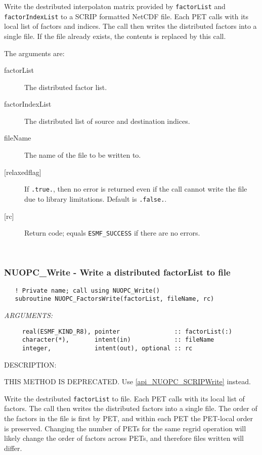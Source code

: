      \label{api_NUOPC_SCRIPWrite}
     Write the destributed interpolaton matrix provided by {\tt factorList} 
     and {\tt factorIndexList} to a SCRIP formatted NetCDF file. Each PET calls
     with its local list of factors and indices. The call then writes the 
     distributed factors into a single file. If the file already exists, the
     contents is replaced by this call.
  
     The arguments are:
     \begin{description}
     \item[factorList]
       The distributed factor list.
     \item[factorIndexList]
       The distributed list of source and destination indices.
     \item[fileName]
       The name of the file to be written to.
     \item[{[relaxedflag]}]
       If {\tt .true.}, then no error is returned even if the call cannot write
       the file due to library limitations. Default is {\tt .false.}.
     \item[{[rc]}]
       Return code; equals {\tt ESMF\_SUCCESS} if there are no errors.
     \end{description}
   
 
\mbox{}\hrulefill\ 
 
\subsubsection [NUOPC\_Write] {NUOPC\_Write - Write a distributed factorList to file}


\begin{verbatim}   ! Private name; call using NUOPC_Write()
   subroutine NUOPC_FactorsWrite(factorList, fileName, rc)\end{verbatim}{\em ARGUMENTS:}
\begin{verbatim}     real(ESMF_KIND_R8), pointer               :: factorList(:)
     character(*),       intent(in)            :: fileName
     integer,            intent(out), optional :: rc\end{verbatim}
{\sf DESCRIPTION:\\ }


  
     THIS METHOD IS DEPRECATED. Use \ref{api_NUOPC_SCRIPWrite} instead.
   
     Write the destributed {\tt factorList} to file. Each PET calls with its 
     local list of factors. The call then writes the distributed factors into
     a single file. The order of the factors in the file is first by PET, and 
     within each PET the PET-local order is preserved. Changing the number of 
     PETs for the same regrid operation will likely change the order of factors
     across PETs, and therefore files written will differ.
  
